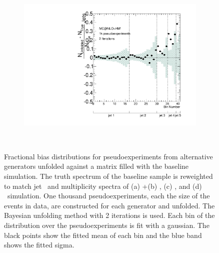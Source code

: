 \begin{figure}
\begin{subfigure}[]{0.45\textwidth}
\end{subfigure}
~
\begin{subfigure}[]{0.45\textwidth}
\includegraphics[width=\textwidth]{fig/Stress/105200atlfast/FracBias2Iterations.pdf}
\end{subfigure}
~
\caption{Fractional bias distributions for pseudoexperiments from alternative generators unfolded against a matrix filled with the baseline simulation. The truth spectrum of the baseline sample is reweighted to match jet \pt\ and multiplicity spectra of (a) \pow+\hw (b) \madpy, (c) \hdamp, and (d) \mcnlohw~simulation. One thousand pseudoexperiments, each the size of the events in data, are constructed for each generator and unfolded. The Bayesian unfolding method with 2 iterations is used. Each bin of the distribution over the pseudoexperiments is fit with a gaussian. The black points show the fitted mean of each bin and the blue band shows the fitted sigma.}
\label{fig:fracbias}
\end{figure}
